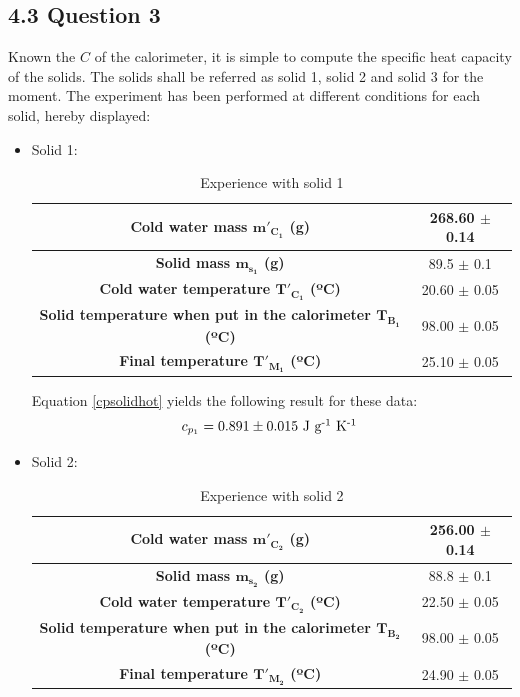 \documentclass[a4paper, 12pt]{article}
\begin{document}
	\subsection{4.3 Question 3}
	Known the $C$ of the calorimeter, it is simple to compute the specific heat capacity of the solids. The solids shall be referred as solid 1, solid 2 and solid 3 for the moment. The experiment has been performed at different conditions for each solid, hereby displayed:
	\begin{itemize}
		\item Solid 1: \\
		
		\begin{table}[h!]
			\centering
			\caption{Experience with solid 1}
			\begin{tabular}{|c|c|}
				\hline
					\textbf{Cold water mass $\boldsymbol{m'_{C_1}}$ (g)} & 268.60 $\pm$ 0.14 \\
				\hline
					\textbf{Solid mass $\boldsymbol{m_{s_1}}$ (g)} & 89.5 $\pm$ 0.1 \\
				\hline
				\hline
					\textbf{Cold water temperature $\boldsymbol{T'_{C_1}}$ (ºC)} & 20.60 $\pm$ 0.05 \\
				\hline
					\textbf{Solid temperature when put in the calorimeter $\boldsymbol{T_{B_1}}$ (ºC)} & 98.00 $\pm$ 0.05 \\
				\hline
					\textbf{Final temperature $\boldsymbol{T'_{M_1}}$ (ºC)} & 25.10 $\pm$ 0.05 \\
				\hline
			\end{tabular}
		
		\end{table}
		Equation \ref{cpsolidhot} yields the following result for these data:
		\begin{equation*}\label{rsolid1}
			c_{p_1} = 0.891 \pm 0.015\mbox{ J g\textsuperscript{-1} K\textsuperscript{-1} }
		\end{equation*}
		\item Solid 2: \\
		
		\begin{table}[h!]
			\centering
				\caption{Experience with solid 2}
			\begin{tabular}{|c|c|}
				\hline
				\textbf{Cold water mass $\boldsymbol{m'_{C_2}}$ (g)} & 256.00 $\pm$ 0.14 \\
				\hline
				\textbf{Solid mass $\boldsymbol{m_{s_2}}$ (g)} & 88.8 $\pm$ 0.1 \\
				\hline
				\hline
				\textbf{Cold water temperature $\boldsymbol{T'_{C_2}}$ (ºC)} & 22.50 $\pm$ 0.05 \\
				\hline
				\textbf{Solid temperature when put in the calorimeter $\boldsymbol{T_{B_2}}$ (ºC)} & 98.00 $\pm$ 0.05 \\
				\hline
				\textbf{Final temperature $\boldsymbol{T'_{M_2}}$ (ºC)} & 24.90 $\pm$ 0.05 \\
				\hline
			\end{tabular}
		

\end{table}
\end{itemize}
\end{document}
